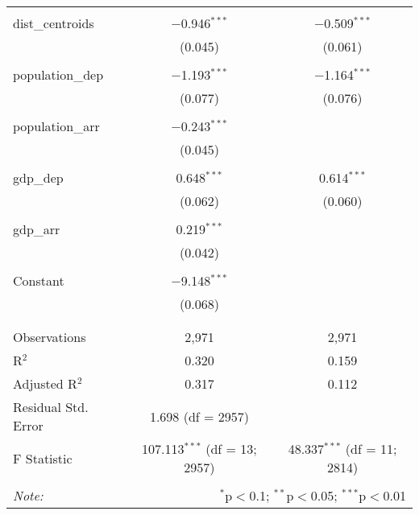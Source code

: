 \begin{table}[!htbp]
\begin{tabular}{@{\extracolsep{5pt}}lcc}
  & & \\ 
 dist\_centroids & $-$0.946$^{***}$ & $-$0.509$^{***}$ \\ 
  & (0.045) & (0.061) \\ 
  & & \\ 
 population\_dep & $-$1.193$^{***}$ & $-$1.164$^{***}$ \\ 
  & (0.077) & (0.076) \\ 
  & & \\ 
 population\_arr & $-$0.243$^{***}$ &  \\ 
  & (0.045) &  \\ 
  & & \\ 
 gdp\_dep & 0.648$^{***}$ & 0.614$^{***}$ \\ 
  & (0.062) & (0.060) \\ 
  & & \\ 
 gdp\_arr & 0.219$^{***}$ &  \\ 
  & (0.042) &  \\ 
  & & \\ 
 Constant & $-$9.148$^{***}$ &  \\ 
  & (0.068) &  \\ 
  & & \\ 
\hline \\[-1.8ex] 
Observations & 2,971 & 2,971 \\ 
R$^{2}$ & 0.320 & 0.159 \\ 
Adjusted R$^{2}$ & 0.317 & 0.112 \\ 
Residual Std. Error & 1.698 (df = 2957) &  \\ 
F Statistic & 107.113$^{***}$ (df = 13; 2957) & 48.337$^{***}$ (df = 11; 2814) \\ 
\hline 
\hline \\[-1.8ex] 
\textit{Note:}  & \multicolumn{2}{r}{$^{*}$p$<$0.1; $^{**}$p$<$0.05; $^{***}$p$<$0.01} \\ 
\end{tabular} 
\end{table} 
